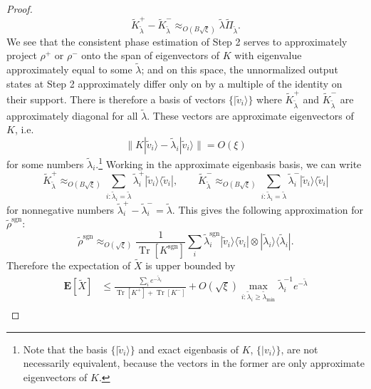 \documentclass[a4paper,UKenglish,cleveref, autoref]{lipics-v2019}
\theoremstyle{remark}
\numberwithin{equation}{section}
\numberwithin{oracle}{section}
\numberwithin{remark}{section}
\newcommand{\ket}[1]{|#1\rangle}
\newcommand{\bra}[1]{\langle#1|}
\newcommand{\E}{\mathbf{E}}
\DeclareMathOperator{\tr}{Tr}
\begin{document}
\begin{proof}
\begin{equation}
\tilde{K}^+_{\tilde{\lambda}} - \tilde{K}^-_{\tilde{\lambda}} \approx_{O(B\sqrt{\xi})} \tilde{\lambda}\widetilde{\Pi}_{\tilde{\lambda}}.
\end{equation}
We see that the consistent phase estimation of Step 2 serves to approximately project $\rho^+$ or $\rho^-$ onto the span of eigenvectors of $K$ with eigenvalue approximately equal to some $\tilde{\lambda}$; and on this space, the unnormalized output states at Step 2 approximately differ only on by a multiple of the identity on their support. There is therefore a basis of vectors $\{\ket{\tilde{v}_i}\}$ where $\widetilde{K}^+_{\tilde{\lambda}}$ and $\widetilde{K}^-_{\tilde{\lambda}}$ are approximately diagonal for all $\tilde{\lambda}$. These vectors are approximate eigenvectors of $K$, i.e.
\begin{equation}\label{eq:tilde-v}
\|K \ket{\tilde{v}_i} - \tilde{\lambda}_i \ket{\tilde{v}_i} \| = O(\xi)
\end{equation}
for some numbers $\tilde{\lambda}_i$.\footnote{Note that the basis $\{\ket{\tilde{v}_i}\}$ and exact eigenbasis of $K$, $\{\ket{v_i}\}$, are not necessarily equivalent, because the vectors in the former are only approximate eigenvectors of $K$.} Working in the approximate eigenbasis basis, we can write
\begin{equation}
\widetilde{K}^+_{\tilde{\lambda}} \approx_{O(B\sqrt{\xi})} \sum_{i: \tilde{\lambda}_i = \tilde{\lambda}} \tilde{\lambda}^+_i \ket{\tilde{v}_i}\bra{\tilde{v}_i}, \quad \quad
\widetilde{K}^-_{\tilde{\lambda}} \approx_{O(B\sqrt{\xi})} \sum_{i: \tilde{\lambda}_i = \tilde{\lambda}} \tilde{\lambda}^-_i \ket{\tilde{v}_i}\bra{\tilde{v}_i}
\end{equation}
for nonnegative numbers $\tilde{\lambda}^+_i - \tilde{\lambda}^-_i = \tilde{\lambda}$. This gives the following approximation for $\tilde{\rho}^\text{sgn}$:
\begin{equation}\label{eq:tilde-rho-app}
\tilde{\rho}^{\text{sgn}} \approx_{O(\sqrt{\xi})} \frac{1}{\tr[K^{\text{sgn}}]}\sum_i \tilde{\lambda}^{\text{sgn}}_i \ket{\tilde{v}_i}\bra{\tilde{v}_i} \otimes \ket{\tilde{\lambda}_i}\bra{\tilde{\lambda}_i}.
\end{equation}
Therefore the expectation of $\widetilde{X}$ is upper bounded by
\begin{align}
\E[\widetilde{X}] &\le \frac{\sum_i e^{-\tilde{\lambda}_i}}{\tr[K^+]+\tr[K^-]} + O(\sqrt{\xi}) \max_{i: \tilde{\lambda}_i \ge \tilde{\lambda}_{\text{min}}} \tilde{\lambda}_i^{-1}e^{-\tilde{\lambda}} \\

\end{align}
\end{proof}
\end{document}
